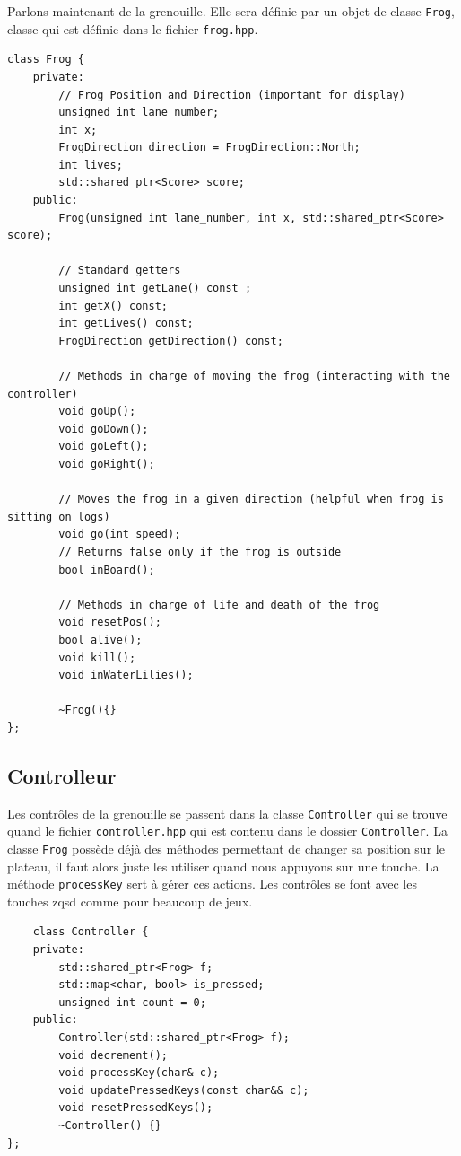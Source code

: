 \documentclass[a4paper, 12pt]{article}
\begin{document}
Parlons maintenant de la grenouille. Elle sera définie par un objet de classe \texttt{Frog}, classe qui est définie dans le fichier \texttt{frog.hpp}.

\begin{lstlisting}
class Frog {
    private:
        // Frog Position and Direction (important for display)
        unsigned int lane_number;
        int x;
        FrogDirection direction = FrogDirection::North;
        int lives;
        std::shared_ptr<Score> score;
    public:
        Frog(unsigned int lane_number, int x, std::shared_ptr<Score> score);

        // Standard getters
        unsigned int getLane() const ;
        int getX() const;
        int getLives() const;
        FrogDirection getDirection() const;

        // Methods in charge of moving the frog (interacting with the controller)
        void goUp();
        void goDown();
        void goLeft();
        void goRight();

        // Moves the frog in a given direction (helpful when frog is sitting on logs)
        void go(int speed);
        // Returns false only if the frog is outside
        bool inBoard();

        // Methods in charge of life and death of the frog
        void resetPos();
        bool alive();
        void kill();
        void inWaterLilies();

        ~Frog(){}
};
\end{lstlisting}

\subsection{Controlleur}

Les contrôles de la grenouille se passent dans la classe \texttt{Controller} qui se trouve quand le fichier \texttt{controller.hpp} qui est contenu dans le dossier \texttt{Controller}.
La classe \texttt{Frog} possède déjà des méthodes permettant de changer sa position sur le plateau, il faut alors juste les utiliser quand nous appuyons sur une touche. La méthode \texttt{processKey} sert à gérer ces actions. Les contrôles se font avec les touches zqsd comme pour beaucoup de jeux. 

\begin{lstlisting}
    class Controller {
    private:
        std::shared_ptr<Frog> f;
        std::map<char, bool> is_pressed;
        unsigned int count = 0;
    public:
        Controller(std::shared_ptr<Frog> f);
        void decrement();
        void processKey(char& c);
        void updatePressedKeys(const char&& c);
        void resetPressedKeys();
        ~Controller() {}
};
\end{lstlisting}
\end{document}
